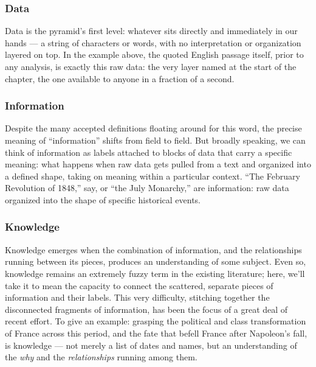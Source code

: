 \subsubsection{Data}
Data is the pyramid's first level: whatever sits directly and immediately in our hands --- a string of characters or words, with no interpretation or organization layered on top. In the example above, the quoted English passage itself, prior to any analysis, is exactly this raw data: the very layer named at the start of the chapter, the one available to anyone in a fraction of a second.

\subsubsection{Information}
Despite the many accepted definitions floating around for this word, the precise meaning of ``information'' shifts from field to field. But broadly speaking, we can think of information as labels attached to blocks of data that carry a specific meaning: what happens when raw data gets pulled from a text and organized into a defined shape, taking on meaning within a particular context. ``The February Revolution of 1848,'' say, or ``the July Monarchy,'' are information: raw data organized into the shape of specific historical events.

\subsubsection{Knowledge}
Knowledge emerges when the combination of information, and the relationships running between its pieces, produces an understanding of some subject. Even so, knowledge remains an extremely fuzzy term in the existing literature; here, we'll take it to mean the capacity to connect the scattered, separate pieces of information and their labels. This very difficulty, stitching together the disconnected fragments of information, has been the focus of a great deal of recent effort. To give an example: grasping the political and class transformation of France across this period, and the fate that befell France after Napoleon's fall, is knowledge --- not merely a list of dates and names, but an understanding of the \emph{why} and the \emph{relationships} running among them.

